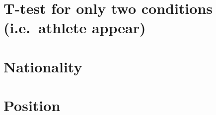 \documentclass[
]{article}
\begin{document}
\hypertarget{t-test-for-only-two-conditions-i.e.-athlete-appear}{%
\section{T-test for only two conditions (i.e.~athlete
appear)}\label{t-test-for-only-two-conditions-i.e.-athlete-appear}}

\hypertarget{nationality}{%
\section{Nationality}\label{nationality}}

\hypertarget{position}{%
\section{Position}\label{position}}
\end{document}
